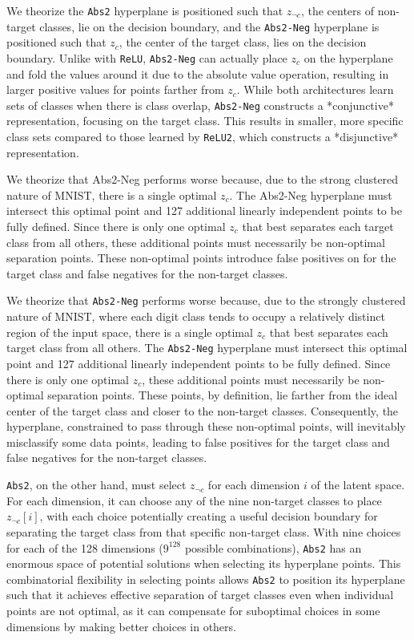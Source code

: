We theorize the \texttt{Abs2} hyperplane is positioned such that $z_{\neg c}$, the centers of non-target classes, lie on the decision boundary, and the \texttt{Abs2-Neg} hyperplane is positioned such that $z_c$, the center of the target class, lies on the decision boundary. Unlike with \texttt{ReLU}, \texttt{Abs2-Neg} can actually place $z_c$ on the hyperplane and fold the values around it due to the absolute value operation, resulting in larger positive values for points farther from $z_c$. While both architectures learn sets of classes when there is class overlap, \texttt{Abs2-Neg} constructs a *conjunctive* representation, focusing on the target class. This results in smaller, more specific class sets compared to those learned by \texttt{ReLU2}, which constructs a *disjunctive* representation.

We theorize that Abs2-Neg performs worse because, due to the strong clustered nature of MNIST, there is a single optimal $z_c$. The Abs2-Neg hyperplane must intersect this optimal point and 127 additional linearly independent points to be fully defined. Since there is only one optimal $z_c$ that best separates each target class from all others, these additional points must necessarily be non-optimal separation points. These non-optimal points introduce false positives on for the target class and false negatives for the non-target classes. 

We theorize that \texttt{Abs2-Neg} performs worse because, due to the strongly clustered nature of MNIST, where each digit class tends to occupy a relatively distinct region of the input space, there is a single optimal $z_c$ that best separates each target class from all others. The \texttt{Abs2-Neg} hyperplane must intersect this optimal point and 127 additional linearly independent points to be fully defined. Since there is only one optimal $z_c$, these additional points must necessarily be non-optimal separation points. These points, by definition, lie farther from the ideal center of the target class and closer to the non-target classes. Consequently, the hyperplane, constrained to pass through these non-optimal points, will inevitably misclassify some data points, leading to false positives for the target class and false negatives for the non-target classes. 

\texttt{Abs2}, on the other hand, must select $z_{\neg c}$ for each dimension $i$ of the latent space. For each dimension, it can choose any of the nine non-target classes to place $z_{\neg c}[i]$, with each choice potentially creating a useful decision boundary for separating the target class from that specific non-target class. With nine choices for each of the 128 dimensions ($9^{128}$ possible combinations), \texttt{Abs2} has an enormous space of potential solutions when selecting its hyperplane points. This combinatorial flexibility in selecting points allows \texttt{Abs2} to position its hyperplane such that it achieves effective separation of target classes even when individual points are not optimal, as it can compensate for suboptimal choices in some dimensions by making better choices in others.

